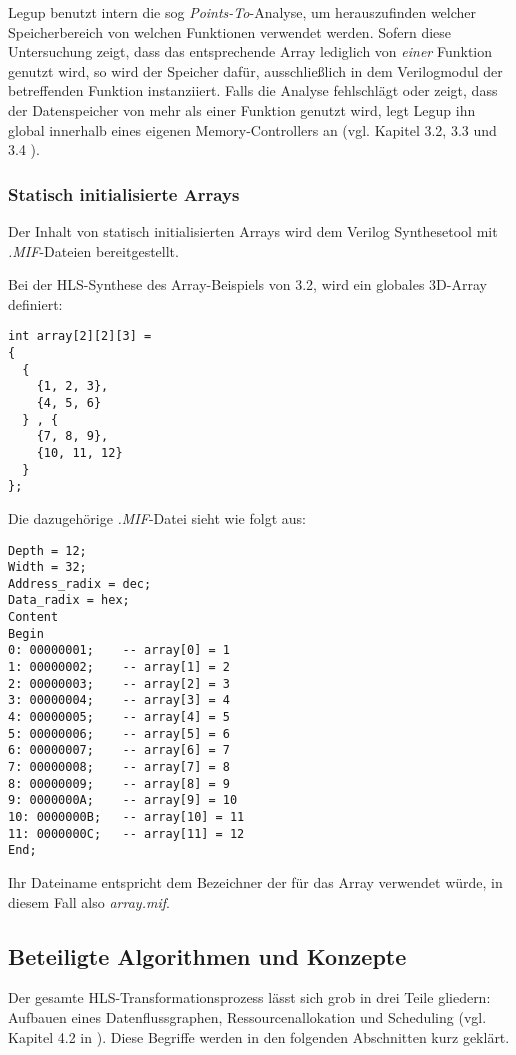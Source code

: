\documentclass[oneside,a4paper]{article}
\begin{document}
Legup benutzt intern die sog \emph{Points-To}-Analyse, um herauszufinden
welcher Speicherbereich von welchen Funktionen verwendet werden. Sofern diese
Untersuchung zeigt, dass das entsprechende Array lediglich von \emph{einer}
Funktion genutzt wird, so wird der Speicher dafür, ausschließlich in dem Verilogmodul der
betreffenden Funktion instanziiert. Falls die Analyse fehlschlägt oder
zeigt, dass der Datenspeicher von mehr als einer Funktion genutzt wird,
legt Legup ihn global innerhalb eines eigenen Memory-Controllers an
(vgl. Kapitel 3.2, 3.3 und 3.4 \cite{LEGUP}).

\subsubsection{Statisch initialisierte Arrays}

Der Inhalt von statisch initialisierten Arrays wird dem Verilog
Synthesetool mit \emph{.MIF}-Dateien bereitgestellt.

Bei der HLS-Synthese des Array-Beispiels
von 3.2, wird ein globales 3D-Array definiert:
\begin{lstlisting}[style=c]
int array[2][2][3] =
{
  {
    {1, 2, 3},
    {4, 5, 6}
  } , {
    {7, 8, 9},
    {10, 11, 12}
  }
};
\end{lstlisting}

Die dazugehörige \emph{.MIF}-Datei sieht wie folgt aus:
\begin{verbatim}
Depth = 12;
Width = 32;
Address_radix = dec;
Data_radix = hex;
Content
Begin
0: 00000001;    -- array[0] = 1
1: 00000002;    -- array[1] = 2
2: 00000003;    -- array[2] = 3
3: 00000004;    -- array[3] = 4
4: 00000005;    -- array[4] = 5
5: 00000006;    -- array[5] = 6
6: 00000007;    -- array[6] = 7
7: 00000008;    -- array[7] = 8
8: 00000009;    -- array[8] = 9
9: 0000000A;    -- array[9] = 10
10: 0000000B;   -- array[10] = 11
11: 0000000C;   -- array[11] = 12
End;
\end{verbatim}
Ihr Dateiname entspricht dem Bezeichner der für das
Array verwendet würde, in diesem Fall also \emph{array.mif}.

\subsection{Beteiligte Algorithmen und Konzepte}
Der gesamte HLS-Transformationsprozess lässt sich
grob in drei Teile gliedern: Aufbauen eines Datenflussgraphen,
Ressourcenallokation und Scheduling (vgl. Kapitel 4.2 in \cite{BLUE}).
Diese Begriffe werden
in den folgenden Abschnitten kurz geklärt.
\end{document}
